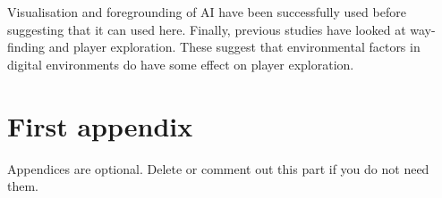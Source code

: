 \documentclass[journal]{IEEEtran}
\begin{document}
Visualisation and foregrounding of AI have been successfully used before suggesting that it can used here. Finally, previous studies have looked at way-finding and player exploration. These suggest that environmental factors in digital environments do have some effect on player exploration.






 \appendices
 \section{First appendix}
 Appendices are optional. Delete or comment out this part if you do not need them.

\end{document}
